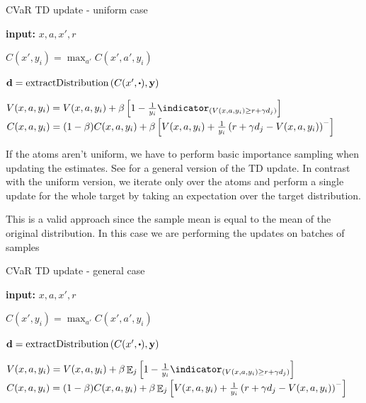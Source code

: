 \begin{algorithm}
\caption{CVaR TD update - uniform case}
\begin{algorithmic}[1]\label{alg:cvartd}

    \STATE \textbf{input:} $x, a, x', r$
    
	\STATE $C(x', y_i) = \max_{a'} C(x', a', y_i)$ \label{alg:cvartd:1}
	\ENDFOR
	
	\STATE $\mathbf{d}= \text{extractDistribution}\bround{C(x', \bigcdot), \mathbf{y}}$ \label{alg:cvartd:2}

	\STATE $V(x, a, y_i) = V(x, a, y_i) + \beta \bsquare{1 - \frac{1}{y_i}\indicator_{(V(x, a, y_i) \ge r+\gamma d_j)}}$  \label{alg:cvartd:4}
	\STATE $C(x, a, y_i) = (1-\beta)C(x, a, y_i) + \beta\left[ {V(x, a, y_i) + \frac{1}{y_i}\left( {r+\gamma d_j - V(x, a, y_i)} \right)^-} \right]$\label{alg:cvartd:5}
	\ENDFOR
\end{algorithmic}
\end{algorithm}

If the atoms aren't uniform, we have to perform basic importance sampling when updating the estimates. See  for a general version of the TD update. In contrast with the uniform version, we iterate only over the atoms and perform a single update for the whole target by taking an expectation over the target distribution. 

This is a valid approach since the sample mean is equal to the mean of the original distribution. In this case we are performing the updates on batches of samples 


\begin{algorithm}
\caption{CVaR TD update - general case}
\begin{algorithmic}\label{alg:cvartdg}

    \STATE \textbf{input:} $x, a, x', r$
    
	\STATE $C(x', y_i) = \max_{a'} C(x', a', y_i)$ \label{alg:cvartdg:1}
	\ENDFOR
	
	\STATE $\mathbf{d}= \text{extractDistribution}\bround{C(x', \bigcdot), \mathbf{y}}$ \label{alg:cvartdg:2} \label{alg:cvartd:2}

	\STATE $V(x, a, y_i) = V(x, a, y_i) + \beta \expect_j\bsquare{1 - \frac{1}{y_i}\indicator_{(V(x, a, y_i) \ge r+\gamma d_j)}}$  \label{alg:cvartd:4}
	\STATE $C(x, a, y_i) = (1-\beta)C(x, a, y_i) + \beta\mathop{\mathbb{E}}_j\left[ {V(x, a, y_i) + \frac{1}{y_i}\left( {r+\gamma d_j - V(x, a, y_i)} \right)^-} \right]$\label{alg:cvartdg:5}
	\ENDFOR
\end{algorithmic}
\end{algorithm}

